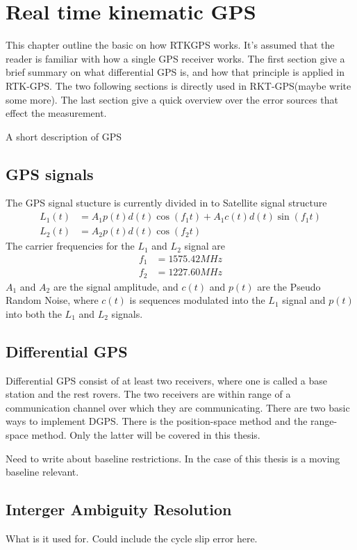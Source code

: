 
\chapter{Real time kinematic GPS}
This chapter outline the basic on how RTKGPS works. It's assumed that the reader is familiar with how a single GPS receiver works. The first section give a brief summary on what differential GPS is, and how that principle is applied in RTK-GPS. The two following sections is directly used in RKT-GPS(maybe write some more). The last section give a quick overview over the error sources that effect the measurement.

A short description of GPS
\section{GPS signals}

The GPS signal stucture is currently divided in to 
Satellite signal structure
\begin{align*}
L_1(t) &= A_1p(t)d(t)\cos(f_1t) + A_1c(t)d(t)\sin(f_1t) \\
L_2(t) &= A_2p(t)d(t)\cos(f_2t)
\end{align*}
The carrier frequencies for the $L_1$ and $ L_2$ signal are
\begin{align*}
f_1 &= 1575.42 MHz \\
f_2 &= 1227.60 MHz
\end{align*}
$A_1$ and $A_2$ are the signal amplitude, and $c(t)$ and $p(t)$ are the Pseudo Random Noise, where $c(t)$ is sequences modulated into the $L_1$ signal and $p(t)$ into both the $L_1$ and $L_2$ signals.
\section{Differential GPS}
Differential GPS consist of at least two receivers, where one is called a base station and the rest rovers. The two receivers are within range of a communication channel over which they are communicating. There are two basic ways to implement DGPS. There is the position-space method and the range-space method. Only the latter will be covered in this thesis.

Need to write about baseline restrictions. In the case of this thesis is a moving baseline relevant. 
\section{Interger Ambiguity Resolution}
What is it used for. Could include the cycle slip error here.
